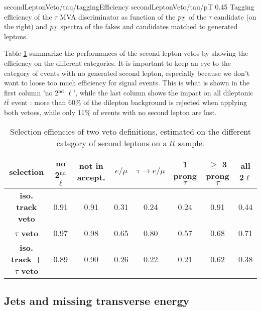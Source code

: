                      {secondLeptonVeto/tau/taggingEfficiency}
                     {secondLeptonVeto/tau/pT}
                     {0.45}
                     {Tagging efficiency of the $\tau$ MVA discriminator as function of the
                     $p_T$ of the $\tau$ candidate (on the right) and $p_T$ spectra of
                     the fakes and candidates matched to generated leptons.}

    Table \ref{tab:secondLeptonVetoPerformances} summarize the performances of the
    second lepton vetos by showing the efficiency on the different categories.
    It is important to keep an eye to the category of events with no generated second lepton,
    especially because we don't want to loose too much efficiency for signal events.
    This is what is shown in the first column 'no 2$^\text{nd}$ $\ell$', while the last
    column shows the impact on all dileptonic $t\bar{t}$ event : more than 60\% of the dilepton
    background is rejected when applying both vetoes, while only 11\% of events with no
    second lepton are lost.

    \begin{table}
    \hspace*{-1.2cm}
    \begin{tabular}{|c|c|ccccc|c|}
        \hline
        \textbf{selection}                  & no 2$^\text{nd}$ $\ell$ & not in accept. & $e/\mu$ & $\tau \rightarrow e/\mu$ & 1 prong $\tau $ & $\geq$ 3 prong $\tau$ & all 2$\ell$ \\
        \hline
        \textbf{iso. track veto}            & 0.91                    & 0.91  & 0.31  & 0.24  & 0.24  & 0.91  & 0.44  \\
        \textbf{$\tau$ veto}                & 0.97                    & 0.98  & 0.65  & 0.80  & 0.57  & 0.68  & 0.71  \\
        \hline
        \textbf{iso. track + $\tau$ veto}   & 0.89                    & 0.90  & 0.26  & 0.22  & 0.21  & 0.62  & 0.38 \\
        \hline
    \end{tabular}
        \caption{Selection effiencies of two veto definitions, estimated on the different category of second leptons on a $t\bar{t}$ sample.}
        \label{tab:secondLeptonVetoPerformances}
    \end{table}

        \subsection{Jets and missing transverse energy}

